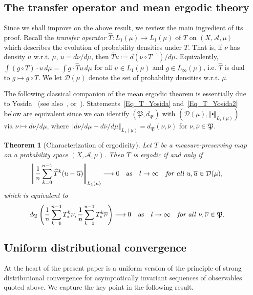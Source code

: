 \documentclass[10pt]{amsart}
\newtheorem{theo}{Theorem}[section]
\theoremstyle{definition}\newtheorem{defi}[theo]{Definition}\newtheorem{rema}[theo]{Remark}\newtheorem{exam}[theo]{Example}\newtheorem{exem}[theo]{Example}\newtheorem{nota}[theo]{Notation}
\newcommand{\clA}{\mathcal{A}}
\newcommand{\clD}{\mathcal{D}}
\newcommand{\frkP}{\mathfrak{P}}
\begin{document}
\subsection{The transfer operator and mean ergodic theory}
Since we shall improve on the above result, we review the main ingredient of its proof. Recall the \emph{transfer operator} $\widehat{T}:L_{1}(\mu)\rightarrow L_{1}(\mu)$ of $T$ on $(X,\clA,\mu)$ which describes the evolution of probability densities under $T$. That is, if $\nu$ has density $u$ w.r.t. $\mu$, $u=d\nu/d\mu$, then $\widehat{T}u:=d(\nu\circ T^{-1})/d\mu$. Equivalently, $\int(g\circ T)\cdot u\,d\mu=\int g\cdot\widehat{T}u\,d\mu$ for all $u\in L_{1}(\mu)$ and $g\in L_{\infty}(\mu)$, i.e. $\widehat{T}$ is dual to $g\longmapsto g\circ T$. We let $\clD(\mu)$ denote the set of probability densities w.r.t. $\mu$.


The following classical companion of the mean ergodic theorem is essentially due to Yosida~\cite{Yos} (see also~\cite[Theorem~2.1.3]{Kr},  or~\cite[Theorem~2]{Z7}). Statements~\eqref{Eq_T_Yosida} and~\eqref{Eq_T_Yosida2} below are equivalent since we can identify $(\frkP,d_{\frkP})$ with $(\clD(\mu),\left\Vert \centerdot\right\Vert _{L_{1}(\mu)})$ via $\nu\mapsto d\nu/d\mu$, where $\left\Vert d\nu/d\mu-d\overline{\nu} /d\mu\right\Vert _{L_{1}(\mu)}=d_{\frkP}(\nu,\overline{\nu})$ for $\nu,\overline{\nu}\in\frkP$.

\begin{theo}[{Characterization of ergodicity}]\label{T_Yosida}
Let $T$ be a measure-preserving map on a probability space $(X,\clA,\mu)$. Then $T$ is ergodic if and only if 
\begin{equation}\label{Eq_T_Yosida}
\left\Vert \frac{1}{n}\sum_{k=0}^{n-1}\widehat{T}^{k}(u-\overline {u})\right\Vert _{L_{1}(\mu)}\longrightarrow0\quad\text{as}\quad l\rightarrow
\infty\quad\text{\textit{for all} }u,\overline{u}\in\clD(\mu),
\end{equation}
which is equivalent to
\begin{equation}\label{Eq_T_Yosida2}
d_{\frkP}\left(\frac{1}{n}\sum_{k=0}^{n-1}T_{\ast}^{k}\nu,\frac{1} {n}\sum_{k=0}^{n-1}T_{\ast}^{k}\overline{\nu}\right) \longrightarrow0\quad \text{as}\quad l\rightarrow\infty\quad\text{\textit{for all} }\nu,\overline{\nu}
\in\frkP.
\end{equation}
\end{theo}


\subsection{Uniform distributional convergence}
At the heart of the present paper is a uniform version of the principle of strong distributional convergence for asymptotically invariant sequences of observables quoted above. We capture the key point in the following result.
\end{document}
